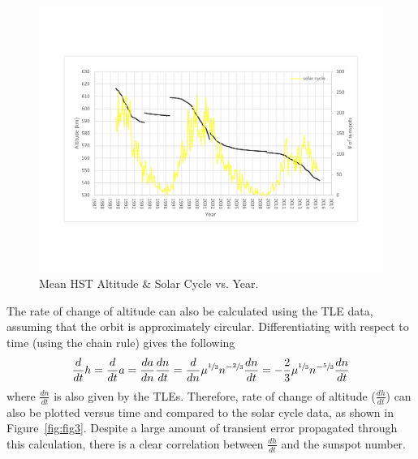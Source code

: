 \documentclass[paper=letter, fontsize=11pt]{scrartcl} %
\numberwithin{equation}{section} %
\numberwithin{figure}{section} %
\numberwithin{table}{section} %
\begin{document}
\begin{figure}[H]
\begin{center}
\includegraphics[width=1\textwidth]{figs2/2.pdf}
\caption{Mean HST Altitude \& Solar Cycle vs. Year.}
\label{fig:fig2}
\end{center}
\end{figure}

The rate of change of altitude can also be calculated using the TLE data, assuming that the orbit is approximately circular. Differentiating with respect to time (using the chain rule) gives the following
\begin{align*}
\dfrac{d}{dt} h = \dfrac{d}{dt} a = \dfrac{da}{dn} \dfrac{dn}{dt} = \dfrac{d}{dn} \mu^{\sfrac{1}{3}} n^{-\sfrac{2}{3}} \dfrac{dn}{dt} = -\dfrac{2}{3} \mu^{\sfrac{1}{3}} n^{-\sfrac{5}{3}} \dfrac{dn}{dt}
\end{align*}
where $\frac{dn}{dt}$ is also given by the TLEs. Therefore, rate of change of altitude ($\frac{dh}{dt}$) can also be plotted versus time and compared to the solar cycle data, as shown in Figure~\ref{fig:fig3}. Despite a large amount of transient error propagated through this calculation, there is a clear correlation between $\frac{dh}{dt}$ and the sunspot number.
\end{document}
